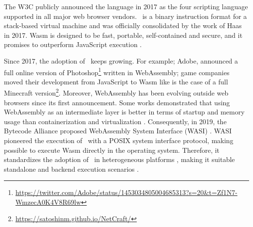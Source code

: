 \msection{\Wasm}


The W3C publicly announced the \Wasm language in 2017 as the four scripting language supported in all major web browser vendors.
\wasm\ is a binary instruction format for a stack-based virtual machine and was officially consolidated by the work of Haas \etal \cite{Haas_2017} in 2017. 
Wasm is designed to be fast, portable, self-contained and secure, and it promises to outperform JavaScript execution \cite{Haas_2017}. 

Since 2017, the adoption of \wasm\ keeps growing. 
For example; Adobe, announced a full online version of Photoshop\footnote{\url{https://twitter.com/Adobe/status/1453034805004685313?s=20&t=Zf1N7-WmzecA0K4V8R69lw}} written in WebAssembly;  game companies moved their development from JavaScript to Wasm like is the case of a full Minecraft version\footnote{\url{https://satoshinm.github.io/NetCraft/}}. 
Moreover, WebAssembly has been evolving outside web browsers since its first announcement.
Some works demonstrated that using WebAssembly as an intermediate layer is better in terms of startup and memory usage than containerization and virtualization \cite{pMendkiServerless, 1244493Jacobsson}. 
Consequently, in 2019, the Bytecode Alliance \cite{bytecodealliance} proposed WebAssembly System Interface (WASI) \cite{WASI}. 
WASI pioneered the execution of \wasm\ with a POSIX system interface protocol, making possible to execute Wasm directly in the operating system. 
Therefore, it standardizes the adoption of \wasm\ in heterogeneous platforms \cite{bryant2020webassembly}, making it suitable standalone and backend execution scenarios \cite{9640153, wen2020wasmachine}.

